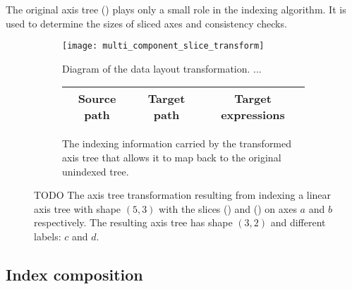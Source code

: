 \documentclass[thesis]{subfiles}
\begin{document}
The original axis tree () plays only a small role in the indexing algorithm.
It is used to determine the sizes of sliced axes and consistency checks.




\begin{figure}
  \centering
  \begin{subfigure}{\textwidth}
    \centering
    \texttt{[image: multi\_component\_slice\_transform]}
    \caption{
      Diagram of the data layout transformation.
      ...
    }
    \label{fig:multi_component_slice_transform_flowchart}
  \end{subfigure}

  \vspace{1em}

  \begin{subfigure}{\textwidth}
    \centering
    \begin{tabular}{|c|c|c|}
      \hline
      \textbf{Source path} & \textbf{Target path} & \textbf{Target expressions} \\
      \hline
      \hline
    \end{tabular}
    \caption{
      The indexing information carried by the transformed axis tree that allows it to map back to the original unindexed tree.
    }
    \label{fig:multi_component_slice_transform_exprs}
  \end{subfigure}

  \caption{
    TODO
    The axis tree transformation resulting from indexing a linear axis tree with shape $(5, 3)$ with the slices () and () on axes $a$ and $b$ respectively.
    The resulting axis tree has shape $(3, 2)$ and different labels: $c$ and $d$.
  }
  \label{fig:multi_component_slice_transform}
\end{figure}


\subsection{Index composition}
\label{sec:index_composition}
\end{document}
